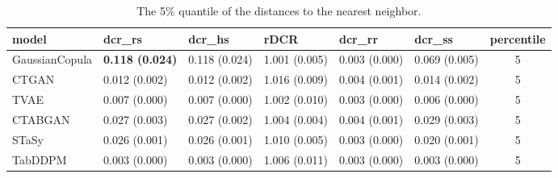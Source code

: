 \begin{table*}[h!]
\vspace{-5mm}
\caption{The 5\% quantile of the distances to the nearest neighbor.}
\label{tab:privacy}
\begin{adjustbox}{width=\textwidth, center} 

\begin{tabular}{|l|l|l|l|l|l|c|}
\hline
model          & dcr\_rs                & dcr\_hs       & rDCR         & dcr\_rr       & dcr\_ss       & percentile \\ \hline
GaussianCopula & \textbf{0.118 (0.024)} & 0.118 (0.024) & 1.001 (0.005) & 0.003 (0.000) & 0.069 (0.005) & 5          \\ \hline
CTGAN          & 0.012 (0.002)          & 0.012 (0.002) & 1.016 (0.009) & 0.004 (0.001) & 0.014 (0.002) & 5          \\ \hline
TVAE           & 0.007 (0.000)          & 0.007 (0.000) & 1.002 (0.010) & 0.003 (0.000) & 0.006 (0.000) & 5          \\ \hline
CTABGAN        & 0.027 (0.003)          & 0.027 (0.002) & 1.004 (0.004) & 0.004 (0.001) & 0.029 (0.003) & 5          \\ \hline
STaSy          & 0.026 (0.001)          & 0.026 (0.001) & 1.010 (0.005) & 0.003 (0.000) & 0.020 (0.001) & 5          \\ \hline
TabDDPM        & 0.003 (0.000)          & 0.003 (0.000) & 1.006 (0.011) & 0.003 (0.000) & 0.003 (0.000) & 5          \\ \hline
\end{tabular}

\end{adjustbox}
\vspace{-5mm}
\end{table*}